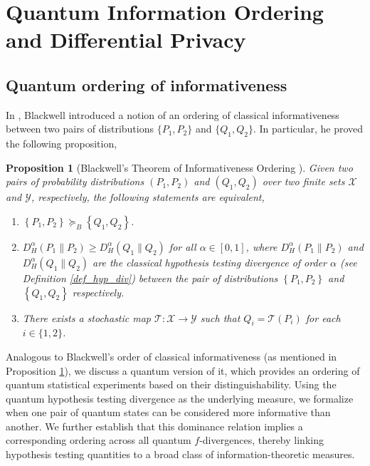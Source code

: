 \documentclass[onecolumn,ldraftcls, 11pt]{IEEEtran}
\newcommand*{\cT}{\mathcal{T}}
\newcommand*{\cX}{\mathcal{X}}
\newcommand*{\cY}{\mathcal{Y}}
\newtheorem{proposition}{Proposition}
\begin{document}
\section{Quantum Information Ordering and Differential Privacy}\label{sec_diff_priv_quant}

\subsection{Quantum ordering of informativeness}

In \cite{Blackwell51,BG54}, Blackwell introduced a notion of an ordering of classical informativeness between two pairs of distributions $\{P_1,P_2\}$ and $\{Q_1,Q_2\}$. In particular, he proved the following proposition,

\begin{proposition}[Blackwell's Theorem of Informativeness Ordering {\cite[Theorems $12.2.2$ \& $12.4.2$]{BG54}}]\label{prop_blackwell}
    Given two pairs of probability distributions $\left(P_1,P_2\right)$ and $\left(Q_1,Q_2\right)$ over two finite sets $\cX$ and $\cY$, respectively, the following statements are equivalent,
    \begin{enumerate}
        \item $\left\{P_1,P_2\right\} \succeq_{B} \left\{Q_1,Q_2\right\}$.
        \item $D^{\alpha}_{H}{(P_1\|P_2)} \geq D^{\alpha}_{H}{(Q_1\|Q_2)} $ for all $\alpha \in [0,1]$, where $D^{\alpha}_{H}{(P_1\|P_2)}$ and $D^{\alpha}_{H}{(Q_1\|Q_2)}$ are the classical hypothesis testing divergence of order $\alpha$ (see Definition \ref{def_hyp_div}) between the pair of distributions $\left\{P_1,P_2\right\}$ and $\left\{Q_1,Q_2\right\}$ respectively.
        \item There exists a stochastic map $\cT : \cX \to \cY$ such that $Q_i = \cT(P_i)$ for each $i \in \{1,2\}$.\label{map_exist}
    \end{enumerate}
\end{proposition}


Analogous to Blackwell's order of classical informativeness (as mentioned in Proposition \ref{prop_blackwell}), we discuss a quantum version of it, which provides an ordering of quantum statistical experiments based on their distinguishability. Using the quantum hypothesis testing divergence as the underlying measure, we formalize when one pair of quantum states can be considered more informative than another. We further establish that this dominance relation implies a corresponding ordering across all quantum $f$-divergences, thereby linking hypothesis testing quantities to a broad class of information-theoretic measures.
\end{document}
